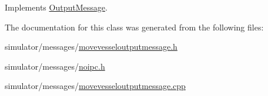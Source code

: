 Implements \mbox{\hyperlink{class_output_message_a42e0a2560b1bf9e58b6626056f87b8c2}{Output\+Message}}.



The documentation for this class was generated from the following files\+:\begin{DoxyCompactItemize}
\item 
simulator/messages/\mbox{\hyperlink{movevesseloutputmessage_8h}{movevesseloutputmessage.\+h}}\item 
simulator/messages/\mbox{\hyperlink{noipc_8h}{noipc.\+h}}\item 
simulator/messages/\mbox{\hyperlink{movevesseloutputmessage_8cpp}{movevesseloutputmessage.\+cpp}}\end{DoxyCompactItemize}
